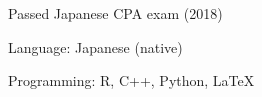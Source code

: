 

\begin{cventries}

\cventrysimple
    {Passed Japanese CPA exam (2018)}  %
    {} %
    {}

\cventrysimple
    {Language: Japanese (native)}  %
    {} %
    {}

\cventrysimple
    {Programming: R, C++, Python, \LaTeX}  %
    {} %
    {}

\end{cventries}
